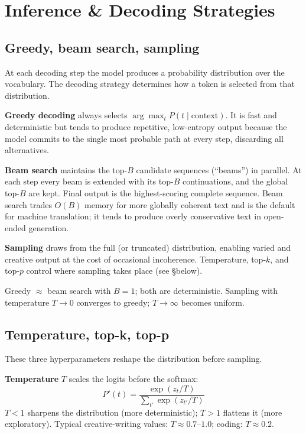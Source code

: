 
\section{Inference \& Decoding Strategies}

\subsection{Greedy, beam search, sampling}

At each decoding step the model produces a probability distribution over the vocabulary.
The decoding strategy determines how a token is selected from that distribution.

\textbf{Greedy decoding} always selects $\arg\max_t P(t \mid \text{context})$. It is
fast and deterministic but tends to produce repetitive, low-entropy output because the
model commits to the single most probable path at every step, discarding all alternatives.

\textbf{Beam search} maintains the top-$B$ candidate sequences (``beams'') in parallel.
At each step every beam is extended with its top-$B$ continuations, and the global
top-$B$ are kept. Final output is the highest-scoring complete sequence. Beam search
trades $O(B)$ memory for more globally coherent text and is the default for machine
translation; it tends to produce overly conservative text in open-ended generation.

\textbf{Sampling} draws from the full (or truncated) distribution, enabling varied and
creative output at the cost of occasional incoherence. Temperature, top-$k$, and top-$p$
control where sampling takes place (see \S below).

\begin{intuitionbox}
  Greedy $\approx$ beam search with $B=1$; both are deterministic.
  Sampling with temperature $T \to 0$ converges to greedy; $T \to \infty$ becomes uniform.
\end{intuitionbox}

\subsection{Temperature, top-k, top-p}

These three hyperparameters reshape the distribution before sampling.

\textbf{Temperature} $T$ scales the logits before the softmax:
\[
  P'(t) = \frac{\exp(z_t / T)}{\sum_{t'}\exp(z_{t'} / T)}
\]
$T < 1$ sharpens the distribution (more deterministic); $T > 1$ flattens it (more
exploratory). Typical creative-writing values: $T \approx 0.7$--$1.0$; coding: $T \approx
0.2$.

